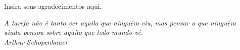 \documentclass[
	12pt,				%
    oneside,			%
	a4paper,			%
	english,			%
	french,				%
	spanish,			%
	brazil,				%
	]{abntex2}
\begin{document}
\frenchspacing 


\imprimircapa

\imprimirfolhaderosto*






\begin{agradecimentos}
Insira seus agradecimentos aqui.
\end{agradecimentos}

\vspace*{\fill}
{ \raggedleft
	\textit{A tarefa não é tanto ver aquilo que ninguém viu, mas pensar o que ninguém ainda pensou sobre aquilo que todo mundo vê. \\
		Arthur Schopenhauer}
	~
}
\pagebreak


\end{document}
